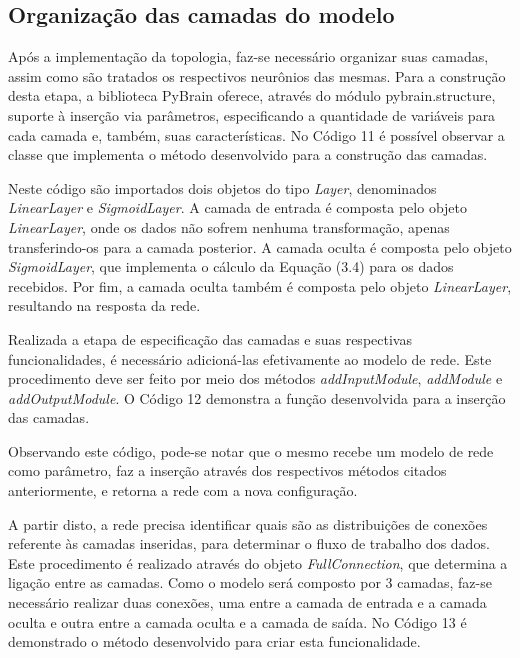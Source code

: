 

\subsection{Organização das camadas do modelo}
Após a implementação da topologia, faz-se necessário organizar suas camadas, assim como são tratados os respectivos neurônios das mesmas. Para a construção desta etapa, a biblioteca PyBrain oferece, através do módulo pybrain.structure, suporte à inserção via parâmetros, especificando a quantidade de variáveis para cada camada e, também, suas características. No Código 11 é possível observar a classe que implementa o método desenvolvido para a construção das camadas.



Neste código são importados dois objetos do tipo \textit{Layer}, denominados \textit{LinearLayer} e \textit{SigmoidLayer}. A camada de entrada é composta pelo objeto \textit{LinearLayer}, onde os dados não sofrem nenhuma transformação, apenas transferindo-os para a camada posterior. A camada oculta é composta pelo objeto \textit{SigmoidLayer}, que implementa o cálculo da Equação (3.4) para os dados recebidos. Por fim, a camada oculta também é composta pelo objeto \textit{LinearLayer}, resultando na resposta da rede.   

Realizada a etapa de especificação das camadas e suas respectivas funcionalidades, é necessário adicioná-las efetivamente ao modelo de rede. Este procedimento deve ser feito por meio dos métodos \textit{addInputModule}, \textit{addModule} e \textit{addOutputModule}. O Código 12 demonstra a função desenvolvida para a inserção das camadas.



Observando este código, pode-se notar que o mesmo recebe um modelo de rede como parâmetro, faz a inserção através dos respectivos métodos citados anteriormente, e retorna a rede com a nova configuração.

A partir disto, a rede precisa identificar quais são as distribuições de conexões referente às camadas inseridas, para determinar o fluxo de trabalho dos dados. Este procedimento é realizado através do objeto \textit{FullConnection}, que determina a ligação entre as camadas. Como o modelo será composto por 3 camadas, faz-se necessário realizar duas conexões, uma entre a camada de entrada e a camada oculta e outra entre a camada oculta e a camada de saída. No Código 13 é demonstrado o método desenvolvido para criar esta funcionalidade.

